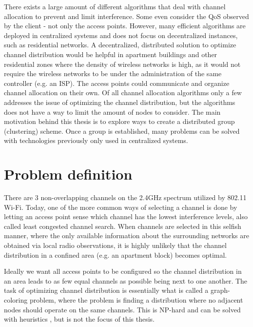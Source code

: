 There exists a large amount of different algorithms that deal with channel allocation to prevent and limit interference. Some even consider the QoS observed by the client - not only the access points.
However, many efficient algorithms are deployed in centralized systems and does not focus on decentralized instances, such as residential networks.
A decentralized, distributed solution to optimize channel distribution would be helpful in apartment buildings and other residential zones where the density of wireless networks is high,
as it would not require the wireless networks to be under the administration of the same controller (e.g. an ISP). The access points could communicate and organize channel allocation
on their own. Of all channel allocation algorithms only a few addresses the issue of optimizing the channel distribution,
but the algorithms does not have a way to limit the amount of nodes to consider.  The main motivation behind this thesis is to explore ways to create a distributed group (clustering) scheme. Once a group is established, many problems can be solved with technologies previously only used in centralized systems.

\section{Problem definition}
There are 3 non-overlapping channels on the 2.4GHz spectrum utilized by 802.11 Wi-Fi. Today, one of the more common ways of selecting a channel
is done by letting an access point sense which channel has the lowest interference levels, also called least congested channel search.
When channels are selected in this selfish manner, where the only available information about the surrounding networks are obtained via
local radio observations, it is highly unlikely that the channel distribution in a confined area (e.g. an apartment block) becomes optimal.  

Ideally we want all access points to be configured so the channel distribution in an area leads to as few equal channels as possible
being next to one another. The task of optimizing channel distribution is essentially what is called a graph-coloring problem, where the problem is
finding a distribution where no adjacent nodes should operate on the same channels. This is NP-hard and can be solved with heuristics \cite{Brelaz}, but is not the focus of this thesis. 

